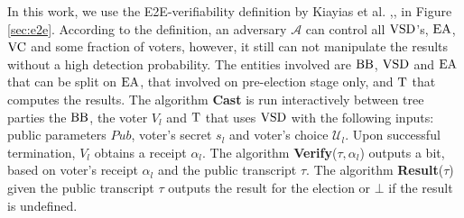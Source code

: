  In this work, we use the E2E-verifiability definition by Kiayias et al. \cite{Kiayias2015a},\cite{Kiayias2015},  in Figure \ref{sec:e2e}. 
According to the definition, an adversary $\mathcal{A}$ can control all $\operatorname{VSD}$'s, $\operatorname{EA}$, $\operatorname{VC}$ and some fraction of voters, however, it still can not manipulate the results without a high detection probability.  The entities involved are $\operatorname{BB}$, $\operatorname{VSD}$ and $\operatorname{EA}$ that can be split on $\operatorname{EA}$, that involved on pre-election stage only, and $\operatorname{T}$ that computes the results. The algorithm \textbf{Cast} is run interactively between tree parties the $\operatorname{BB}$, the voter $V_l$ and $\operatorname{T}$ that uses $\operatorname{VSD}$ with the following inputs: public parameters $Pub$, voter's secret $s_l$ and voter's choice $\mathcal{U}_l$. Upon successful termination, $V_l$ obtains a receipt $\alpha_l$. The algorithm \textbf{Verify}($\tau,\alpha_l$) outputs a bit, based on voter's receipt $\alpha_l$ and the public transcript $\tau$. The algorithm \textbf{Result}($\tau$) given the public transcript $\tau$  outputs the result for the election or $\bot$ if the result is undefined.\\
